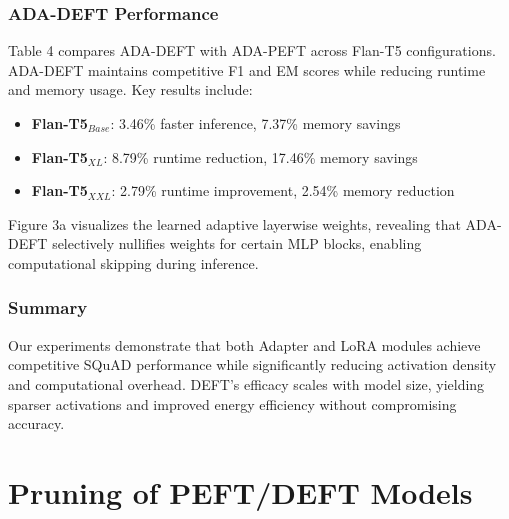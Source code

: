 \documentclass[conference]{IEEEtran}
\begin{document}
\subsubsection*{ADA-DEFT Performance}
Table 4 compares ADA-DEFT with ADA-PEFT across Flan-T5 configurations. ADA-DEFT maintains competitive F1 and EM scores while reducing runtime and memory usage. Key results include:
\begin{itemize}
  \item \textbf{Flan-T5\(_{Base}\)}: 3.46\% faster inference, 7.37\% memory savings
  \item \textbf{Flan-T5\(_{XL}\)}: 8.79\% runtime reduction, 17.46\% memory savings
  \item \textbf{Flan-T5\(_{XXL}\)}: 2.79\% runtime improvement, 2.54\% memory reduction
\end{itemize}
Figure 3a visualizes the learned adaptive layerwise weights, revealing that ADA-DEFT selectively nullifies weights for certain MLP blocks, enabling computational skipping during inference.
\subsubsection*{Summary}
Our experiments demonstrate that both Adapter and LoRA modules achieve competitive SQuAD performance while significantly reducing activation density and computational overhead. DEFT's efficacy scales with model size, yielding sparser activations and improved energy efficiency without compromising accuracy.




\section{Pruning of PEFT/DEFT Models}
\end{document}
